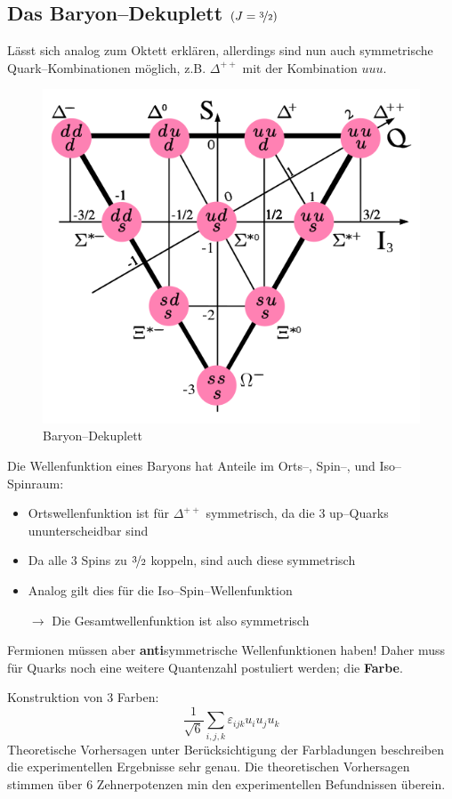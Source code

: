 \documentclass[Ex4_Zusammenfassung.tex]{subfiles}
\begin{document}
\subsection{Das Baryon--Dekuplett $\left( J=\nicefrac{3}{2}\right)$}
Lässt sich analog zum Oktett erklären, allerdings sind nun auch symmetrische Quark--Kombinationen möglich, z.B. $\Delta^{++}$ mit der Kombination $uuu$. 
\begin{figure}[H]
	\centering
	\includegraphics[scale=0.4]{Baryon-decuplet.png}
	\caption{Baryon--Dekuplett}
\end{figure}

Die Wellenfunktion eines Baryons hat Anteile im Orts--, Spin--, und Iso--Spinraum:
\begin{itemize}
	\item Ortswellenfunktion ist für $\Delta^{++}$ symmetrisch, da die 3 up--Quarks ununterscheidbar sind
	\item Da alle 3 Spins zu $\nicefrac{3}{2}$ koppeln, sind auch diese symmetrisch
	\item Analog gilt dies für die Iso--Spin--Wellenfunktion
	\item[$\rightarrow$] Die Gesamtwellenfunktion ist also symmetrisch
\end{itemize}
Fermionen müssen aber \textbf{anti}symmetrische Wellenfunktionen haben! Daher muss für Quarks noch eine weitere Quantenzahl postuliert werden; die \textbf{Farbe}.

Konstruktion von 3 Farben:
\begin{equation}
	\frac{1}{\sqrt{6}} \sum_{i,j,k} \varepsilon_{ijk} u_i u_j u_k
\end{equation}
Theoretische Vorhersagen unter Berücksichtigung der Farbladungen beschreiben die experimentellen Ergebnisse sehr genau. Die theoretischen Vorhersagen stimmen über 6 Zehnerpotenzen min den experimentellen Befundnissen überein. 
\end{document}

